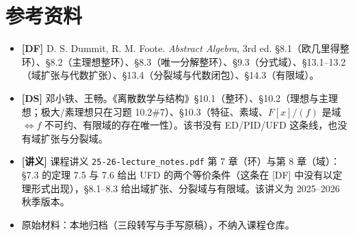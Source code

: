 \documentclass[UTF8,a4paper,11pt]{ctexart}
\begin{document}
\section*{参考资料}
\begin{itemize}
\item \textbf{[DF]} D. S. Dummit, R. M. Foote. \emph{Abstract Algebra}, 3rd ed. §8.1（欧几里得整环）、§8.2（主理想整环）、§8.3（唯一分解整环）、§9.3（分式域）、§13.1--13.2（域扩张与代数扩张）、§13.4（分裂域与代数闭包）、§14.3（有限域）。
\item \textbf{[DS]} 邓小铁、王畅。《离散数学与结构》§10.1（整环）、§10.2（理想与主理想；极大/素理想只在习题 10.2\#7）、§10.3（特征、素域、$F[x]/(f)$ 是域 $\iff f$ 不可约、有限域的存在唯一性）。该书没有 ED/PID/UFD 这条线，也没有域扩张与分裂域。
\item \textbf{[讲义]} 课程讲义 \texttt{25-26-lecture\_notes.pdf} 第 7 章（环）与第 8 章（域）：§7.3 的定理 7.5 与 7.6 给出 UFD 的两个等价条件（这条在 [DF] 中没有以定理形式出现），§8.1--8.3 给出域扩张、分裂域与有限域。该讲义为 2025--2026 秋季版本。
\item 原始材料：本地归档（三段转写与手写原稿），不纳入课程仓库。
\end{itemize}
\end{document}
